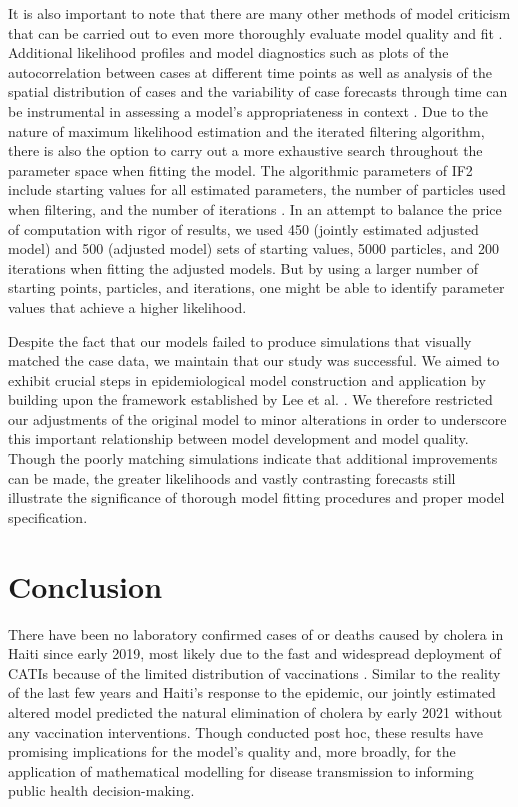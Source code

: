\documentclass[12pt]{article}
\begin{document}
   It is also important to note that there are many other methods of model criticism that can be carried out to even more thoroughly evaluate model quality and fit \cite{Millar, Cole}. Additional likelihood profiles and model diagnostics such as plots of the autocorrelation between cases at different time points as well as analysis of the spatial distribution of cases and the variability of case forecasts through time can be instrumental in assessing a model's appropriateness in context \cite{King_av}. Due to the nature of maximum likelihood estimation and the iterated filtering algorithm, there is also the option to carry out a more exhaustive search throughout the parameter space when fitting the model. The algorithmic parameters of IF2 include starting values for all estimated parameters, the number of particles used when filtering, and the number of iterations \cite{Ionides_infpomp}. In an attempt to balance the price of computation with rigor of results, we used 450 (jointly estimated adjusted model) and 500 (adjusted model) sets of starting values, 5000 particles, and 200 iterations when fitting the adjusted models. But by using a larger number of starting points, particles, and iterations, one might be able to identify parameter values that achieve a higher likelihood. 
   
   Despite the fact that our models failed to produce simulations that visually matched the case data, we maintain that our study was successful. We aimed to exhibit crucial steps in epidemiological model construction and application by building upon the framework established by Lee et al. \cite{Lee_haiticholera}. We therefore restricted our adjustments of the original model to minor alterations in order to underscore this important relationship between model development and model quality. Though the poorly matching simulations indicate that additional improvements can be made, the greater likelihoods and vastly contrasting forecasts still illustrate the significance of thorough model fitting procedures and proper model specification.

\section{Conclusion}

 There have been no laboratory confirmed cases of or deaths caused by cholera in Haiti since early 2019, most likely due to the fast and widespread deployment of CATIs because of the limited distribution of vaccinations \cite{Rebaudet}. Similar to the reality of the last few years and Haiti's response to the epidemic, our jointly estimated altered model predicted the natural elimination of cholera by early 2021 without any vaccination interventions. Though conducted post hoc, these results have promising implications for the model's quality and, more broadly, for the application of mathematical modelling for disease transmission to informing public health decision-making.
\end{document}
